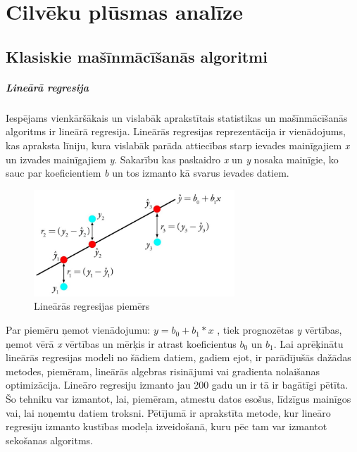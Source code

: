 \chapter{Cilvēku plūsmas analīze}
\section{Klasiskie mašīnmācīšanās algoritmi}
\paragraph{Lineārā regresija}
\hfill\par
Iespējams vienkāršākais un vislabāk aprakstītais statistikas un mašīnmācīšanās algoritms ir lineārā regresija. Lineārās regresijas reprezentācija ir vienādojums, kas apraksta līniju, kura vislabāk parāda attiecības starp ievades mainīgajiem \textit{x} un izvades mainīgajiem \textit{y}. Sakarību kas paskaidro \textit{x} un \textit{y} nosaka mainīgie, ko sauc par koeficientiem \textit{b} un tos izmanto kā svarus ievades datiem.

\begin{figure}[h]%
	\centering
	\includegraphics[height=4cm]{images/linreg.png} %
	\caption{Lineārās regresijas piemērs}%
	\label{fig:example}%
\end{figure} 

Par piemēru ņemot vienādojumu: $ y = b_0 + b_1 * x $ , tiek prognozētas \textit{y} vērtības, ņemot vērā \textit{x} vērtības un mērķis ir atrast koeficientus $b_0$ un $b_1$. Lai aprēķinātu lineārās regresijas modeli no šādiem datiem, gadiem ejot, ir parādījušās dažādas metodes, piemēram, lineārās algebras risinājumi vai gradienta nolaišanas optimizācija. Lineāro regresiju izmanto jau 200 gadu un ir tā ir bagātīgi pētīta. Šo tehniku var izmantot, lai, piemēram, atmestu datos esošus, līdzīgus mainīgos vai, lai noņemtu datiem troksni. Pētījumā \cite{ellis2011linear} ir aprakstīta metode, kur lineāro regresiju izmanto kustības modeļa izveidošanā, kuru pēc tam var izmantot sekošanas algoritms.
\newpage

